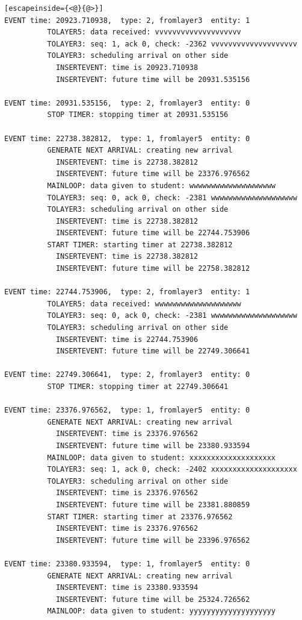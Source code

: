 \documentclass[paper=a4, fontsize=11pt]{scrartcl}
\numberwithin{equation}{section}		%
\numberwithin{figure}{section}			%
\numberwithin{table}{section}				%
\begin{document}
\begin{lstlisting}[escapeinside={<@}{@>}]
EVENT time: 20923.710938,  type: 2, fromlayer3  entity: 1
          TOLAYER5: data received: vvvvvvvvvvvvvvvvvvvv
          TOLAYER3: seq: 1, ack 0, check: -2362 vvvvvvvvvvvvvvvvvvvv
          TOLAYER3: scheduling arrival on other side
            INSERTEVENT: time is 20923.710938
            INSERTEVENT: future time will be 20931.535156

EVENT time: 20931.535156,  type: 2, fromlayer3  entity: 0
          STOP TIMER: stopping timer at 20931.535156

EVENT time: 22738.382812,  type: 1, fromlayer5  entity: 0
          GENERATE NEXT ARRIVAL: creating new arrival
            INSERTEVENT: time is 22738.382812
            INSERTEVENT: future time will be 23376.976562
          MAINLOOP: data given to student: wwwwwwwwwwwwwwwwwwww
          TOLAYER3: seq: 0, ack 0, check: -2381 wwwwwwwwwwwwwwwwwwww
          TOLAYER3: scheduling arrival on other side
            INSERTEVENT: time is 22738.382812
            INSERTEVENT: future time will be 22744.753906
          START TIMER: starting timer at 22738.382812
            INSERTEVENT: time is 22738.382812
            INSERTEVENT: future time will be 22758.382812

EVENT time: 22744.753906,  type: 2, fromlayer3  entity: 1
          TOLAYER5: data received: wwwwwwwwwwwwwwwwwwww
          TOLAYER3: seq: 0, ack 0, check: -2381 wwwwwwwwwwwwwwwwwwww
          TOLAYER3: scheduling arrival on other side
            INSERTEVENT: time is 22744.753906
            INSERTEVENT: future time will be 22749.306641

EVENT time: 22749.306641,  type: 2, fromlayer3  entity: 0
          STOP TIMER: stopping timer at 22749.306641

EVENT time: 23376.976562,  type: 1, fromlayer5  entity: 0
          GENERATE NEXT ARRIVAL: creating new arrival
            INSERTEVENT: time is 23376.976562
            INSERTEVENT: future time will be 23380.933594
          MAINLOOP: data given to student: xxxxxxxxxxxxxxxxxxxx
          TOLAYER3: seq: 1, ack 0, check: -2402 xxxxxxxxxxxxxxxxxxxx
          TOLAYER3: scheduling arrival on other side
            INSERTEVENT: time is 23376.976562
            INSERTEVENT: future time will be 23381.880859
          START TIMER: starting timer at 23376.976562
            INSERTEVENT: time is 23376.976562
            INSERTEVENT: future time will be 23396.976562

EVENT time: 23380.933594,  type: 1, fromlayer5  entity: 0
          GENERATE NEXT ARRIVAL: creating new arrival
            INSERTEVENT: time is 23380.933594
            INSERTEVENT: future time will be 25324.726562
          MAINLOOP: data given to student: yyyyyyyyyyyyyyyyyyyy


\end{lstlisting}
\end{document}
